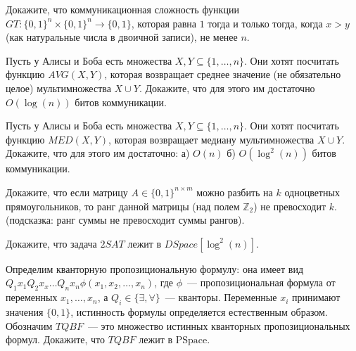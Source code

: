 \setcounter{curtask}{55}


\begin{task}
    Докажите, что коммуникационная сложность функции $GT: \{0, 1\}^n \times \{0,
    1\}^n \rightarrow \{0, 1\}$, которая равна $1$ тогда и только тогда,
    когда $x > y$ (как натуральные числа в двоичной записи), не менее $n$.
\end{task}

\begin{task}
    Пусть у Алисы и Боба есть множества $X, Y \subseteq \{1, \dots, n\}$. Они хотят
    посчитать функцию $AVG(X, Y)$, которая возвращает среднее значение (не
    обязательно целое) мультимножества $X \cup Y$. Докажите, что для этого им
    достаточно $O(\log(n))$ битов коммуникации.
\end{task}

\begin{task}
    Пусть у Алисы и Боба есть множества $X, Y \subseteq \{1, \dots, n\}$. Они хотят
    посчитать функцию $MED(X, Y)$, которая возвращает медиану мультимножества $X \cup
    Y$. Докажите, что для этого им достаточно:
    а) $O(n)$ б) $O(\log^2(n))$ битов коммуникации.
\end{task}

\begin{task}
    Докажите, что если матрицу $A \in \{0, 1\}^{n \times m}$ можно разбить на $k$
    одноцветных прямоугольников, то ранг данной матрицы (над полем $\mathbb{Z}_2$) не
    превосходит $k$. (подсказка: ранг суммы не превосходит суммы рангов).
\end{task}



\breakline

\begin{ptask}{41}
	Докажите, что задача $2SAT$ лежит в $DSpace[\log^2(n)]$.    
\end{ptask}

\begin{ptask}{42}
	Определим кванторную пропозициональную формулу: она имеет вид \\
    $Q_1 x_1 Q_2 x_x \dots Q_n x_n \phi(x_1, x_2, \dots, x_n)$, где $\phi$~---
    пропозициональная формула от переменных $x_1, \dots, x_n$, а $Q_i \in \{\exists,
    \forall\}$~--- кванторы. Переменные $x_i$ принимают значения $\{0, 1\}$,
    истинность формулы определяется естественным образом. Обозначим $TQBF$~--- это
    множество истинных кванторных пропозициональных формул. Докажите, что $TQBF$
    лежит в $\mathrm{PSpace}$.
\end{ptask}

